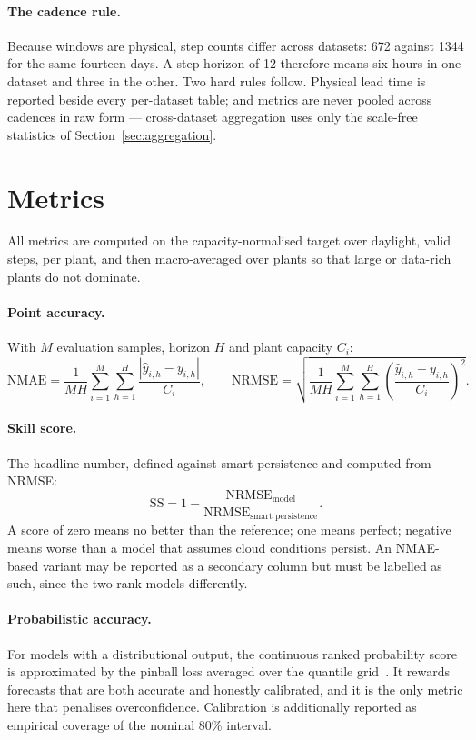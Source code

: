 \paragraph{The cadence rule.} Because windows are physical, step counts differ across
datasets: 672 against 1344 for the same fourteen days. A step-horizon of 12 therefore means
six hours in one dataset and three in the other. Two hard rules follow. Physical lead time
is reported beside every per-dataset table; and metrics are never pooled across cadences in
raw form --- cross-dataset aggregation uses only the scale-free statistics of
Section~\ref{sec:aggregation}.

\section{Metrics}
\label{sec:metrics}

All metrics are computed on the capacity-normalised target over daylight, valid steps, per
plant, and then macro-averaged over plants so that large or data-rich plants do not
dominate.

\paragraph{Point accuracy.} With $M$ evaluation samples, horizon $H$ and plant capacity
$C_i$:
\[
  \mathrm{NMAE} = \frac{1}{M H} \sum_{i=1}^{M} \sum_{h=1}^{H}
  \frac{|\hat{y}_{i,h} - y_{i,h}|}{C_i},
  \qquad
  \mathrm{NRMSE} = \sqrt{\frac{1}{M H} \sum_{i=1}^{M} \sum_{h=1}^{H}
  \left( \frac{\hat{y}_{i,h} - y_{i,h}}{C_i} \right)^{\!2}}.
\]

\paragraph{Skill score.} The headline number, defined against smart persistence and
computed from NRMSE:
\[
  \mathrm{SS} = 1 - \frac{\mathrm{NRMSE}_{\text{model}}}
                        {\mathrm{NRMSE}_{\text{smart persistence}}}.
\]
A score of zero means no better than the reference; one means perfect; negative means
worse than a model that assumes cloud conditions persist. An NMAE-based variant may be
reported as a secondary column but must be labelled as such, since the two rank models
differently.

\paragraph{Probabilistic accuracy.} For models with a distributional output, the continuous
ranked probability score is approximated by the pinball loss averaged over the quantile
grid~\cite{gneiting}. It rewards forecasts that are both accurate and honestly calibrated,
and it is the only metric here that penalises overconfidence. Calibration is additionally
reported as empirical coverage of the nominal 80\% interval.

